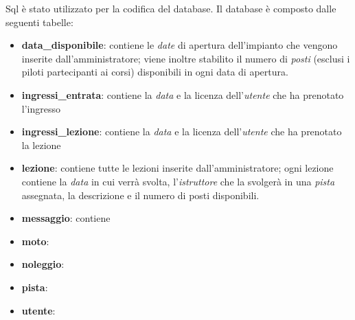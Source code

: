 Sql è stato utilizzato per la codifica del database. Il database è composto dalle seguenti tabelle:
\begin{itemize}
    \item \textbf{data\_disponibile}: contiene le \textit{date} di apertura dell'impianto che vengono
    inserite dall'amministratore; viene inoltre stabilito il numero di \textit{posti} (esclusi i piloti
    partecipanti ai corsi) disponibili in ogni data di apertura.
    \item \textbf{ingressi\_entrata}: contiene la \textit{data} e la licenza dell'\textit{utente} che ha prenotato l'ingresso
    \item \textbf{ingressi\_lezione}: contiene la \textit{data} e la licenza dell'\textit{utente} che ha prenotato la lezione
    \item \textbf{lezione}: contiene tutte le lezioni inserite dall'amministratore; ogni lezione contiene la \textit{data} in cui verrà svolta, l'\textit{istruttore}
    che la svolgerà in una \textit{pista} assegnata, la descrizione e il numero di posti disponibili.
    \item \textbf{messaggio}: contiene
    \item \textbf{moto}:
    \item \textbf{noleggio}:
    \item \textbf{pista}:
    \item \textbf{utente}:
\end{itemize}